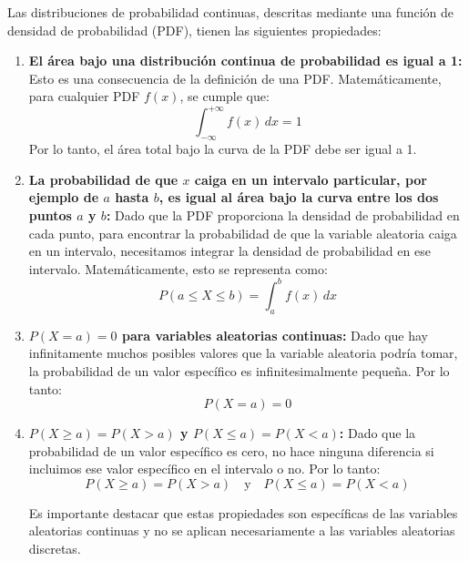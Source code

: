 \documentclass[]{article}
\begin{document}
Las distribuciones de probabilidad continuas, descritas mediante una función de densidad de probabilidad (PDF), tienen las siguientes propiedades:

\begin{enumerate}
	\item \textbf{El área bajo una distribución continua de probabilidad es igual a 1:} Esto es una consecuencia de la definición de una PDF. Matemáticamente, para cualquier PDF $f(x)$, se cumple que: 
	\[
	\int_{-\infty}^{+\infty} f(x) \, dx = 1
	\]
	Por lo tanto, el área total bajo la curva de la PDF debe ser igual a 1.
	
	\item \textbf{La probabilidad de que $x$ caiga en un intervalo particular, por ejemplo de $a$ hasta $b$, es igual al área bajo la curva entre los dos puntos $a$ y $b$:} Dado que la PDF proporciona la densidad de probabilidad en cada punto, para encontrar la probabilidad de que la variable aleatoria caiga en un intervalo, necesitamos integrar la densidad de probabilidad en ese intervalo. Matemáticamente, esto se representa como:
	\[
	P(a \leq X \leq b) = \int_{a}^{b} f(x) \, dx
	\]
	
	\item \textbf{$P(X = a) = 0$ para variables aleatorias continuas:} Dado que hay infinitamente muchos posibles valores que la variable aleatoria podría tomar, la probabilidad de un valor específico es infinitesimalmente pequeña. Por lo tanto:
	\[
	P(X = a) = 0
	\]
	
	\item \textbf{$P(X \geq a) = P(X > a)$ y $P(X \leq a) = P(X < a)$:} Dado que la probabilidad de un valor específico es cero, no hace ninguna diferencia si incluimos ese valor específico en el intervalo o no. Por lo tanto:
	\[
	P(X \geq a) = P(X > a) \quad \text{y} \quad P(X \leq a) = P(X < a)
	\]
	
	Es importante destacar que estas propiedades son específicas de las variables aleatorias continuas y no se aplican necesariamente a las variables aleatorias discretas.
\end{enumerate}
\end{document}

